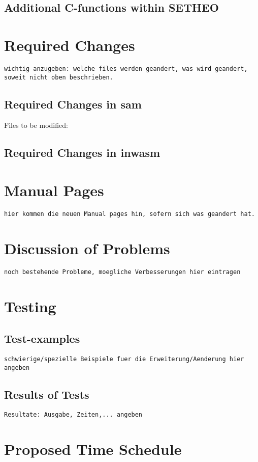 \subsection{Additional C-functions within SETHEO}


\section{Required Changes}

{\tt wichtig anzugeben: welche files werden geandert, was wird
geandert, soweit nicht oben beschrieben.}

\subsection{Required Changes in sam}

Files to be modified:

\subsection{Required Changes in inwasm}


\section{Manual Pages}
{\tt hier kommen die neuen Manual pages hin, sofern sich was geandert hat.}

\section{Discussion of Problems}

{\tt noch bestehende Probleme, moegliche Verbesserungen hier eintragen}

\section{Testing}
\subsection{Test-examples}
{\tt schwierige/spezielle Beispiele fuer die Erweiterung/Aenderung hier angeben}

\subsection{Results of Tests}
{\tt Resultate: Ausgabe, Zeiten,... angeben}

\section{Proposed Time Schedule}

